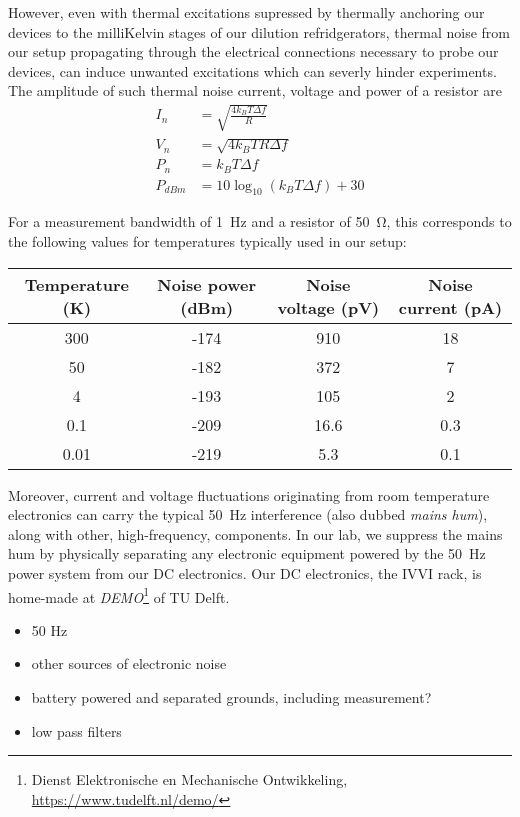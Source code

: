 However, even with thermal excitations supressed by thermally anchoring our devices to the milliKelvin stages of our dilution refridgerators, thermal noise from our setup propagating through the electrical connections necessary to probe our devices, can induce unwanted excitations which can severly hinder experiments.
The amplitude of such thermal noise current, voltage and power of a resistor are
\begin{align}
I_n &= \sqrt{\frac{4k_B T\Delta f}{R}} \\
V_n &= \sqrt{4k_B T R\Delta f} \\
P_n &= k_B T \Delta f \\
P_{dBm} &= 10\log_{10}(k_B T\Delta f)+30
\end{align}

For a measurement bandwidth of \SI{1}{\hertz} and a resistor of \SI{50}{\ohm}, this corresponds to the following values for temperatures typically used in our setup:

\begin{center}
\begin{tabular}{|c|c|c|c|}
	\hline 
	Temperature (\si{\kelvin}) & Noise power (\si{dBm}) & Noise voltage (\si{\pico\volt}) & Noise current (\si{\pico\ampere})\\ 
	\hline 
	300 & -174 & 910 & 18 \\ 
	\hline 
	50 & -182 & 372 & 7 \\ 
	\hline 
	4 & -193 & 105 & 2 \\ 
	\hline 
	0.1 & -209 & 16.6 & 0.3 \\ 
	\hline 
	0.01 & -219 & 5.3 & 0.1 \\ 
	\hline 
\end{tabular}
\end{center}

Moreover, current and voltage fluctuations originating from room temperature electronics can carry the typical \SI{50}{\hertz} interference (also dubbed \textit{mains hum}), along with other, high-frequency, components.
In our lab, we suppress the mains hum by physically separating any electronic equipment powered by the \SI{50}{\hertz} power system from our DC electronics.
Our DC electronics, the IVVI rack, is home-made at \textit{DEMO}\footnote{Dienst Elektronische en Mechanische Ontwikkeling, \url{https://www.tudelft.nl/demo/}} of TU Delft.
\begin{itemize}
	\item 50 Hz
	\item other sources of electronic noise
	\item battery powered and separated grounds, including measurement?
	\item low pass filters
\end{itemize}

